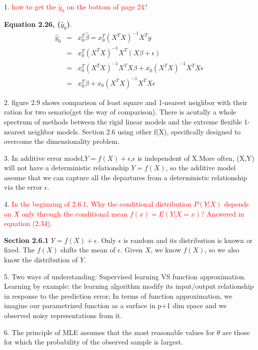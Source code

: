 \documentclass[a4paper, 12pt]{article}
\begin{document}
1. \textcolor{red}{ how to get the $\hat{y}_0$ on the bottom of page 24?}

\vspace{6pt}
\noindent \textbf{Equation 2.26, ($\hat{y}_0$)}. 
\begin{eqnarray*}
	\hat{y}_0 &=& x_0^T\hat{\beta} = x_0^T (X^TX)^{-1} X^Ty\\
	& =& x_0^T (X^TX)^{-1} X^T (X\beta + \epsilon) \\
	& = & x_0^T (X^TX)^{-1} X^T X\beta +x_0 (X^TX)^{-1} X^T X \epsilon \\
	& = & x_0^T \beta +x_0 (X^TX)^{-1} X^T X \epsilon 
\end{eqnarray*}

2. figure 2.9 shows comparison of least square and 1-nearest neighbor with their ration for two senario(get the way of comparison). There is acutally a whole spectrum of methods between the rigid linear models and the extreme flexible 1-nearest neighbor models. Section 2.6 using other f(X), specifically designed to overcome the dimensionality problem.

3. In additive error model,$Y=f(X)+\epsilon$,$\epsilon$ is independent of X.More often, (X,Y) will not have a deterministic relationship $Y=f(X)$, so the additive model assume that we can capture all the departures from a deterministic relationship via the error $\epsilon$.

4. \textcolor{red}{ 
In the beginning of 2.6.1, Why the conditional distribution  $P(Y|X)$ depends on $X$ only through the conditional mean $f(x)=E(Y|X=x)$? Answered in equation (2.34).
}

\vspace{6pt}
\noindent \textbf{Section 2.6.1}
$Y = f(X) + \epsilon$. Only $\epsilon$ is random and its distribution
is known or fixed. The $f(X)$ shifts the mean of $\epsilon$. 
Given $X$, we know $f(X)$, so we also know the distribution of $Y$. 

5. Two ways of understanding: Supervised learning VS function approximation. Learning by example: the learning algorithm modify its input/output relationship in response to the prediction error; In terms of function approximation, we imagine our parametrized function as a surface in p+1 dim space and we observed noisy representations from it.

6. The principle of MLE assumes that the most reasonable values for $\theta$ are those for which the probability of the observed sample is largest.
\end{document}

